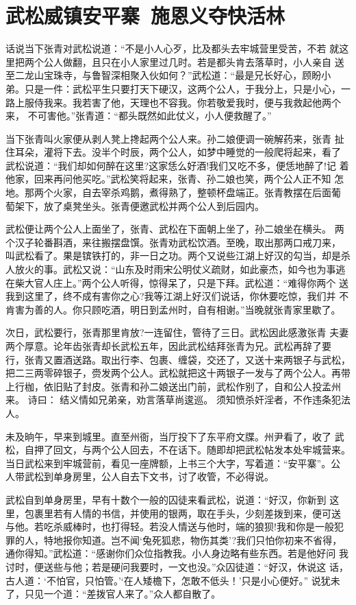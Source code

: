 \chapter{武松威镇安平寨~施恩义夺快活林}

话说当下张青对武松说道：“不是小人心歹，比及都头去牢城营里受苦，不若
就这里把两个公人做翻，且只在小人家里过几时。若是都头肯去落草时，小人亲自
送至二龙山宝珠寺，与鲁智深相聚入伙如何？”武松道：“最是兄长好心，顾盼小
弟。只是一件：武松平生只要打天下硬汉，这两个公人，于我分上，只是小心，一
路上服侍我来。我若害了他，天理也不容我。你若敬爱我时，便与我救起他两个来，
不可害他。”张青道：“都头既然如此仗义，小人便救醒了。”

当下张青叫火家便从剥人凳上搀起两个公人来。孙二娘便调一碗解药来，张青
扯住耳朵，灌将下去。没半个时辰，两个公人，如梦中睡觉的一般爬将起来，看了
武松说道：“我们却如何醉在这里?这家恁么好酒!我们又吃不多，便恁地醉了!记
着他家，回来再问他买吃。”武松笑将起来，张青、孙二娘也笑，两个公人正不知
怎地。那两个火家，自去宰杀鸡鹅，煮得熟了，整顿杯盘端正。张青教摆在后面葡
萄架下，放了桌凳坐头。张青便邀武松并两个公人到后园内。

武松便让两个公人上面坐了，张青、武松在下面朝上坐了，孙二娘坐在横头。
两个汉子轮番斟酒，来往搬摆盘馔。张青劝武松饮酒。至晚，取出那两口戒刀来，
叫武松看了。果是镔铁打的，非一日之功。两个又说些江湖上好汉的勾当，却是杀
人放火的事。武松又说：“山东及时雨宋公明仗义疏财，如此豪杰，如今也为事逃
在柴大官人庄上。”两个公人听得，惊得呆了，只是下拜。武松道：“难得你两个
送我到这里了，终不成有害你之心?我等江湖上好汉们说话，你休要吃惊，我们并
不肯害为善的人。你只顾吃酒，明日到孟州时，自有相谢。”当晚就张青家里歇了。

次日，武松要行，张青那里肯放?一连留住，管待了三日。武松因此感激张青
夫妻两个厚意。论年齿张青却长武松五年，因此武松结拜张青为兄。武松再辞了要
行，张青又置酒送路。取出行李、包裹、缠袋，交还了，又送十来两银子与武松，
把二三两零碎银子，赍发两个公人。武松就把这十两银子一发与了两个公人。再带
上行枷，依旧贴了封皮。张青和孙二娘送出门前，武松作别了，自和公人投孟州来。
诗曰：
结义情如兄弟亲，劝言落草尚逡巡。
须知愤杀奸淫者，不作违条犯法人。

未及晌午，早来到城里。直至州衙，当厅投下了东平府文牒。州尹看了，收了
武松，自押了回文，与两个公人回去，不在话下。随即却把武松帖发本处牢城营来。
当日武松来到牢城营前，看见一座牌额，上书三个大字，写着道：“安平寨”。公
人带武松到单身房里，公人自去下文书，讨了收管，不必得说。

武松自到单身房里，早有十数个一般的囚徒来看武松，说道：“好汉，你新到
这里，包裹里若有人情的书信，并使用的银两，取在手头，少刻差拨到来，便可送
与他。若吃杀威棒时，也打得轻。若没人情送与他时，端的狼狈!我和你是一般犯
罪的人，特地报你知道。岂不闻‘兔死狐悲，物伤其类’?我们只怕你初来不省得，
通你得知。”武松道：“感谢你们众位指教我。小人身边略有些东西。若是他好问
我讨时，便送些与他；若是硬问我要时，一文也没。”众囚徒道：“好汉，休说这
话，古人道：‘不怕官，只怕管。’‘在人矮檐下，怎敢不低头！’只是小心便好。”
说犹未了，只见一个道：“差拨官人来了。”众人都自散了。

